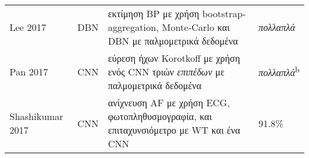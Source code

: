 \begin{sidewaystable}
\begin{tabular}{l c l l}
		\midrule
		Lee 2017~\cite{lee2017deepa}                 & DBN             & εκτίμηση BP με χρήση bootstrap-aggregation, Monte-Carlo και DBN με παλμομετρικά δεδομένα                                                                                                                                                                                                                                                                & \textit{πολλαπλά}                                                                                                                                                                                                                                                                                                                                                                                                                                                                                                          \\
		Pan 2017~\cite{pan2017variation}             & CNN             & εύρεση ήχων Korotkoff με χρήση ενός CNN τριών \textit{επιπέδων} με παλμομετρικά δεδομένα                                                                                                                                                                                                                                                                & \textit{πολλαπλά}\textsuperscript{b}                                                                                                                                                                                                                                                                                                                                                                                                                                                                                  \\
		Shashikumar 2017~\cite{shashikumar2017deep}  & CNN             & ανίχνευση AF με χρήση ECG, φωτοπληθυσμογραφία, και επιταχυνσιόμετρο με WT και ένα CNN                                                                                                                                                                                                                                                                   & 91.8\%                                                                                                                                                                                                                                                                                                                                                                                                                                                                                                                     \\

\end{tabular}
\end{sidewaystable}
